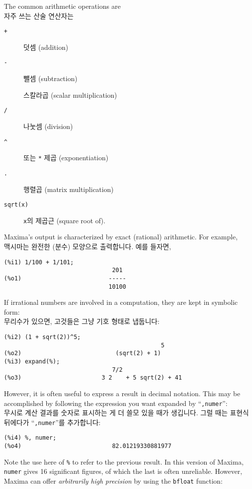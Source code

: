 \documentclass[a4paper,12pt]{article}
\begin{document}
The common arithmetic operations are\\
자주 쓰는 산술 연산자는 
\begin{description}
   \item [{\tt +}] 덧셈 (addition)
   \item [{\tt -}] 뺄셈 (subtraction)
   \item [{\tt *}] 스칼라곱 (scalar multiplication)
   \item [{\tt /}] 나눗셈 (division)
   \item [{\tt \^}]  또는 {\tt **} 제곱 (exponentiation)
   \item [{\tt .}] 행렬곱 (matrix multiplication)
   \item [{\tt sqrt(x)}] {\tt x}의 제곱근 (square root of).
\end{description}
Maxima's output is characterized by exact (rational) arithmetic.  For example, \\
맥시마는 완전한 (분수) 모양으로 출력합니다. 예를 들자면, 
\begin{verbatim}
(%i1) 1/100 + 1/101;
                               201
(%o1)                         -----
                              10100
\end{verbatim}
If irrational numbers are involved in a computation, they are kept in symbolic form: \\
무리수가 있으면, 고것들은 그냥 기호 형태로 냅둡니다:
\begin{verbatim}
(%i2) (1 + sqrt(2))^5;
                                             5
(%o2)                           (sqrt(2) + 1)
(%i3) expand(%);
                               7/2
(%o3)                       3 2    + 5 sqrt(2) + 41
\end{verbatim}
However, it is often useful to express a result in decimal notation.  
This may be accomplished by following the expression you want expanded 
by ``{\tt ,numer}'': \\
무시로 계산 결과를 숫자로 표시하는 게 더 쓸모 있을 때가 생깁니다. 그럴 때는 
표현식 뒤에다가 ``{\tt ,numer}''를 추가합니다:
\begin{verbatim}
(%i4) %, numer;
(%o4)                          82.01219330881977
\end{verbatim}
Note the use here of \verb+%+ 
to refer to the previous result.  In this version of Maxima, {\tt 
  numer} gives 16 significant figures, of which the last is often 
unreliable.  However, Maxima can offer \emph{arbitrarily high
  precision} by using the {\tt bfloat} function: \\
\end{document}
